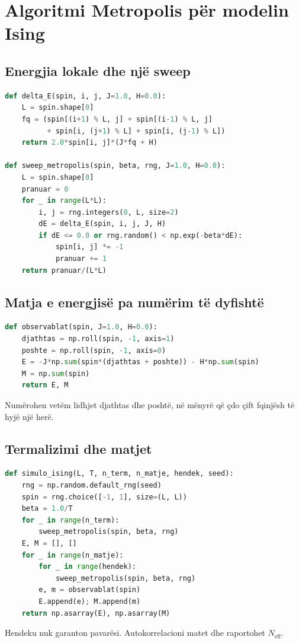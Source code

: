 \section{Algoritmi Metropolis për modelin Ising}
\subsection{Energjia lokale dhe një sweep}
\begin{lstlisting}[language=Python,caption={Përditësimi Metropolis me një spin.}]
def delta_E(spin, i, j, J=1.0, H=0.0):
    L = spin.shape[0]
    fq = (spin[(i+1) % L, j] + spin[(i-1) % L, j]
          + spin[i, (j+1) % L] + spin[i, (j-1) % L])
    return 2.0*spin[i, j]*(J*fq + H)

def sweep_metropolis(spin, beta, rng, J=1.0, H=0.0):
    L = spin.shape[0]
    pranuar = 0
    for _ in range(L*L):
        i, j = rng.integers(0, L, size=2)
        dE = delta_E(spin, i, j, J, H)
        if dE <= 0.0 or rng.random() < np.exp(-beta*dE):
            spin[i, j] *= -1
            pranuar += 1
    return pranuar/(L*L)
\end{lstlisting}

\subsection{Matja e energjisë pa numërim të dyfishtë}
\begin{lstlisting}[language=Python]
def observablat(spin, J=1.0, H=0.0):
    djathtas = np.roll(spin, -1, axis=1)
    poshte = np.roll(spin, -1, axis=0)
    E = -J*np.sum(spin*(djathtas + poshte)) - H*np.sum(spin)
    M = np.sum(spin)
    return E, M
\end{lstlisting}
Numërohen vetëm lidhjet djathtas dhe poshtë, në mënyrë që çdo çift fqinjësh të hyjë një herë.

\subsection{Termalizimi dhe matjet}
\begin{lstlisting}[language=Python,caption={Struktura e një simulimi të plotë.}]
def simulo_ising(L, T, n_term, n_matje, hendek, seed):
    rng = np.random.default_rng(seed)
    spin = rng.choice([-1, 1], size=(L, L))
    beta = 1.0/T
    for _ in range(n_term):
        sweep_metropolis(spin, beta, rng)
    E, M = [], []
    for _ in range(n_matje):
        for _ in range(hendek):
            sweep_metropolis(spin, beta, rng)
        e, m = observablat(spin)
        E.append(e); M.append(m)
    return np.asarray(E), np.asarray(M)
\end{lstlisting}
Hendeku nuk garanton pavarësi. Autokorrelacioni matet dhe raportohet $N_{\mathrm{eff}}$.

